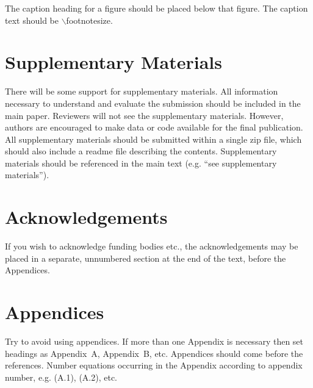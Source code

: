 \documentclass{evolang11}
\begin{document}
The caption heading for a figure should be placed below that figure.
The caption text should be $\backslash$footnotesize.

\section{Supplementary Materials}

There will be some support for supplementary materials.  All information necessary to understand and evaluate the submission should be included in the main paper.  Reviewers will not see the supplementary materials.  However, authors are encouraged to make data or code available for the final publication.  All supplementary materials should be submitted within a single zip file, which should also include a readme file describing the contents.  Supplementary materials should be referenced in the main text (e.g. ``see supplementary materials'').


\section*{Acknowledgements}

If you wish to acknowledge funding bodies etc., the acknowledgements
may be placed in a separate, unnumbered section at the end of the
text, before the Appendices.

\appendix

\section{Appendices}

Try to avoid using appendices.  If more than one Appendix is necessary
then set headings as Appendix~A, Appendix~B, etc.  Appendices should
come before the references. Number equations occurring in the Appendix according to appendix number, e.g. (A.1), (A.2), etc.


 
\end{document}

